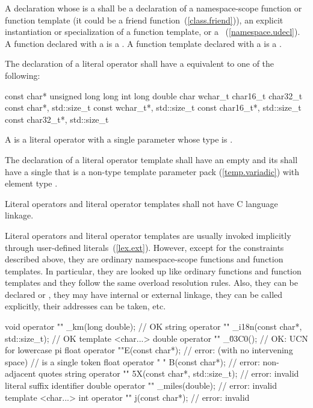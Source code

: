 \pnum
A declaration whose  is a
 shall be a declaration of a namespace-scope
function or function template (it could be a friend
function~(\ref{class.friend})), an explicit instantiation or specialization of a
function template, or a ~(\ref{namespace.udecl}).
A function declared with a  is a . A function template declared with a 
is a .

\pnum
The declaration of a literal operator shall have a
 equivalent to one of the following:

\begin{codeblock}
const char*
unsigned long long int
long double
char
wchar_t
char16_t
char32_t
const char*, std::size_t
const wchar_t*, std::size_t
const char16_t*, std::size_t
const char32_t*, std::size_t
\end{codeblock}

\pnum
A  is a literal operator with a single parameter
whose type is .

\pnum
The declaration of a literal operator template shall have an empty
 and its
 shall have a single
 that is a non-type template parameter
pack (\ref{temp.variadic}) with element type .

\pnum
Literal operators and literal operator templates shall not have C language linkage.

\pnum
\enternote Literal operators and literal operator templates are usually invoked
implicitly through user-defined literals~(\ref{lex.ext}). However, except for
the constraints described above, they are ordinary namespace-scope functions and
function templates. In particular, they are looked up like ordinary functions
and function templates and they follow the same overload resolution rules. Also,
they can be declared  or , they may have internal
or external linkage, they can be called explicitly, their addresses can be
taken, etc. \exitnote

\pnum
\enterexample
\begin{codeblock}
void operator "" _km(long double);                  // OK
string operator "" _i18n(const char*, std::size_t); // OK
template <char...> double operator "" _\u03C0();    // OK: UCN for lowercase pi
float operator ""E(const char*);                    // error:  (with no intervening space)
                                                    // is a single token
float operator " " B(const char*);                  // error: non-adjacent quotes
string operator "" 5X(const char*, std::size_t);    // error: invalid literal suffix identifier
double operator "" _miles(double);                  // error: invalid 
template <char...> int operator "" j(const char*);  // error: invalid 
\end{codeblock}
\exitexample%

